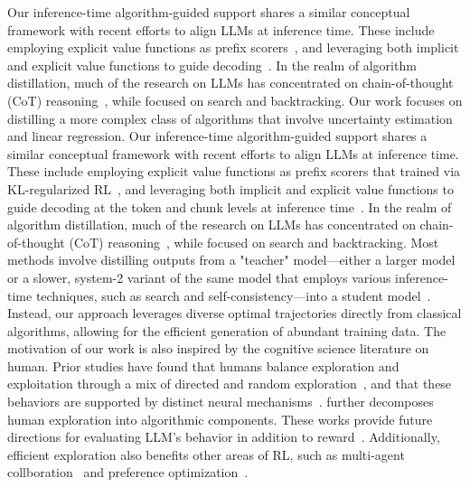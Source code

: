 \documentclass[11pt, logo]{googledeepmind}
\theoremstyle{plain}
\theoremstyle{definition}
\begin{document}
Our inference-time algorithm-guided support shares a similar conceptual framework with recent efforts to align LLMs at inference time. These include employing explicit value functions as prefix scorers~\citep{mudgal2023controlled}, and leveraging both implicit and explicit value functions to guide decoding~\citep{liu2024inference}.
In the realm of algorithm distillation, much of the research on LLMs has concentrated on chain-of-thought (CoT) reasoning~\citep{wang2023scott, li2023symbolic}, while \cite{gandhi2024stream} focused on search and backtracking. Our work focuses on distilling a more complex class of algorithms that involve uncertainty estimation and linear regression.
Our inference-time algorithm-guided support shares a similar conceptual framework with recent efforts to align LLMs at inference time. These include employing explicit value functions as prefix scorers that trained via KL-regularized RL~\citep{mudgal2023controlled}, and leveraging both implicit and explicit value functions to guide decoding at the token and chunk levels at inference time~\citep{liu2024inference}.
In the realm of algorithm distillation, much of the research on LLMs has concentrated on chain-of-thought (CoT) reasoning~\citep{wang2023scott, li2023symbolic}, while \cite{gandhi2024stream} focused on search and backtracking. Most methods involve distilling outputs from a "teacher" model—either a larger model or a slower, system-2 variant of the same model that employs various inference-time techniques, such as search and self-consistency—into a student model~\citep{yu2024distilling}. Instead, our approach leverages diverse optimal trajectories directly from classical algorithms, allowing for the efficient generation of abundant training data.
The motivation of our work is also inspired by the cognitive science literature on human. Prior studies have found that humans balance exploration and exploitation through a mix of directed and random exploration~\citep{wilson2014humans}, and that these behaviors are supported by distinct neural mechanisms~\citep{daw2006cortical}. \citet{gershman2018deconstructing} further decomposes human exploration into algorithmic components. These works provide future directions for evaluating LLM's behavior in addition to reward~\cite{pan2025large}. Additionally, efficient exploration also benefits other areas of RL, such as multi-agent collboration~\citep{qu2024choices} and preference optimization~\citep{bai2025online}.
\end{document}
